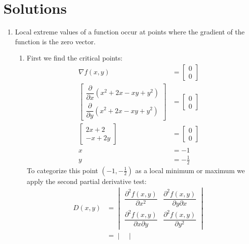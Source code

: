 \documentclass{article}
\begin{document}
\section*{Solutions}
\begin{enumerate}

\item

Local extreme values of a function occur at points where the gradient of
the function is the zero vector.

 \begin{enumerate}
  \item First we find the critical points:
   \begin{align*}
    \nabla f(x,y) &= \begin{bmatrix} 0 \\ 0 \end{bmatrix} \\
    \begin{bmatrix}
     \dfrac{\partial}{\partial x}(x^2 + 2x - xy + y^2) \\
     \dfrac{\partial}{\partial y}(x^2 + 2x - xy + y^2)
    \end{bmatrix} &= \begin{bmatrix} 0 \\ 0 \end{bmatrix} \\
    \begin{bmatrix}
     2x + 2 \\
     -x + 2y
    \end{bmatrix} &= \begin{bmatrix} 0 \\ 0 \end{bmatrix} \\
    x &= -1 \\
    y &= -\frac{1}{2}
   \end{align*}
   To categorize this point $(-1, -\frac{1}{2})$ as a local minimum or maximum
   we apply the second partial derivative test:
   \begin{align*}
    D(x,y)
    &= \begin{vmatrix}
     \dfrac{\partial^2 f(x,y)}{\partial x^2} &
      \dfrac{\partial^2 f(x,y)}{\partial y \partial x} \\
     \dfrac{\partial^2 f(x,y)}{\partial x \partial y} &
      \dfrac{\partial^2 f(x,y)}{\partial y^2}
    \end{vmatrix} \\
    &= \begin{vmatrix}

\end{vmatrix}
\end{align*}
\end{enumerate}
\end{enumerate}
\end{document}
